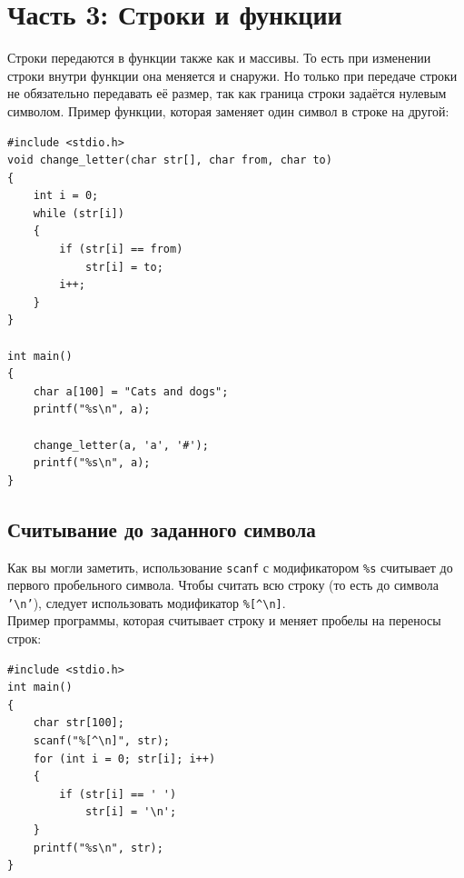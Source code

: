 \documentclass{article}
\begin{document}
\newpage
\section*{Часть 3: Строки и функции}
Строки передаются в функции также как и массивы. То есть при изменении строки внутри функции она меняется и снаружи. Но только при передаче строки не обязательно передавать её размер, так как граница строки задаётся нулевым символом. Пример функции, которая заменяет один символ в строке на другой:
\begin{lstlisting}
#include <stdio.h>
void change_letter(char str[], char from, char to) 
{
    int i = 0;
    while (str[i]) 
    {
        if (str[i] == from) 
            str[i] = to;
        i++;
    }
}

int main() 
{
    char a[100] = "Cats and dogs";
    printf("%s\n", a);
    
    change_letter(a, 'a', '#');
    printf("%s\n", a);
}
\end{lstlisting}

\subsection*{Считывание до заданного символа}
Как вы могли заметить, использование \texttt{scanf} с модификатором \texttt{\%s} считывает до первого пробельного символа. Чтобы считать всю строку (то есть до символа \texttt{'\textbackslash n'}), следует использовать модификатор \verb|%[^\n]|. \\
Пример программы, которая считывает строку и меняет пробелы на переносы строк:
\begin{lstlisting}
#include <stdio.h>
int main() 
{
    char str[100];
    scanf("%[^\n]", str);
    for (int i = 0; str[i]; i++)
    {
        if (str[i] == ' ') 
            str[i] = '\n';
    }
    printf("%s\n", str);
}
\end{lstlisting}


\newpage
\end{document}
